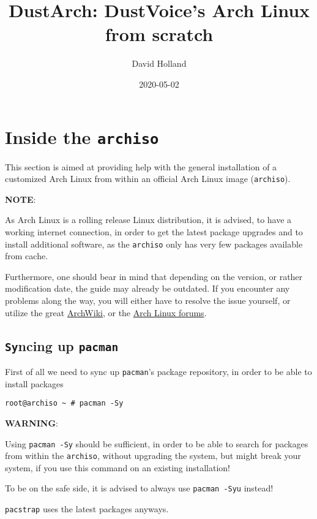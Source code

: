\documentclass[9pt]{report}
\title{DustArch: DustVoice’s Arch Linux from scratch}
\author{David Holland}
\date{2020-05-02}
\newcommand{\admonition}[2]{\textbf{#1}: {#2}}
\begin{document}
\maketitle
\tableofcontents
\hypertarget{x-inside-the-archiso}{\chapter{Inside the \texttt{archiso}}}
This section is aimed at providing help with the general installation of a customized Arch Linux from within an official Arch Linux image (\texttt{archiso}).


\admonition{NOTE}{As Arch Linux is a rolling release Linux distribution, it is advised, to have a working internet connection, in order to get the latest package upgrades and to install additional software, as the \texttt{archiso} only has very few packages available from cache.


Furthermore, one should bear in mind that depending on the version, or rather modification date, the guide may already be outdated.
If you encounter any problems along the way, you will either have to resolve the issue yourself, or utilize the great \href{https://wiki.archlinux.org/}{ArchWiki}, or the \href{https://bbs.archlinux.org/}{Arch Linux forums}.

}

\vfill\eject

\hypertarget{x-syncing-up-pacman}{\section{\texttt{Sy}ncing up \texttt{pacman}}}
First of all we need to sync up \texttt{pacman}'s package repository, in order to be able to install packages


\begin{verbatim}
root@archiso ~ # pacman -Sy
\end{verbatim}

\admonition{WARNING}{Using \texttt{pacman -Sy} should be sufficient, in order to be able to search for packages from within the \texttt{archiso}, without upgrading the system, but might break your system, if you use this command on an existing installation!


To be on the safe side, it is advised to always use \texttt{pacman -Syu} instead!


\texttt{pacstrap} uses the latest packages anyways.

}

\vfill\eject
\end{document}
